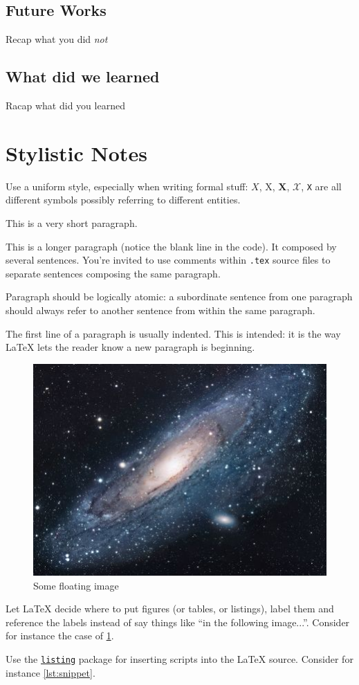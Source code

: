 \documentclass{scrartcl}
\begin{document}
\subsection{Future Works}

Recap what you did \emph{not}

\subsection{What did we learned}

Racap what did you learned

\section*{Stylistic Notes}

Use a uniform style, especially when writing formal stuff: $X$, X, $\mathbf{X}$, $\mathcal{X}$, \texttt{X} are all different symbols possibly referring to different entities. 

This is a very short paragraph.

This is a longer paragraph (notice the blank line in the code).
It composed by several sentences.
%
You're invited to use comments within \texttt{.tex} source files to separate sentences composing the same paragraph.

Paragraph should be logically atomic: a subordinate sentence from one paragraph should always refer to another sentence from within the same paragraph.

The first line of a paragraph is usually indented.
%
This is intended: it is the way \LaTeX{} lets the reader know a new paragraph is beginning.

\begin{figure}
    \centering
    \includegraphics[width=0.5\linewidth]{figures/universe.jpg}
    \caption{Some floating image}
    \label{fig:image}
\end{figure}

Let \LaTeX{} decide where to put figures (or tables, or listings), label them and reference the labels instead of say things like ``in the following image...''.
%
Consider for instance the case of \cref{fig:image}.

Use the \href{https://en.wikibooks.org/wiki/LaTeX/Source_Code_Listings}{\texttt{listing}} package for inserting scripts into the \LaTeX{} source.
%
Consider for instance \cref{lst:snippet}.


\nocite{*} %


\end{document}
